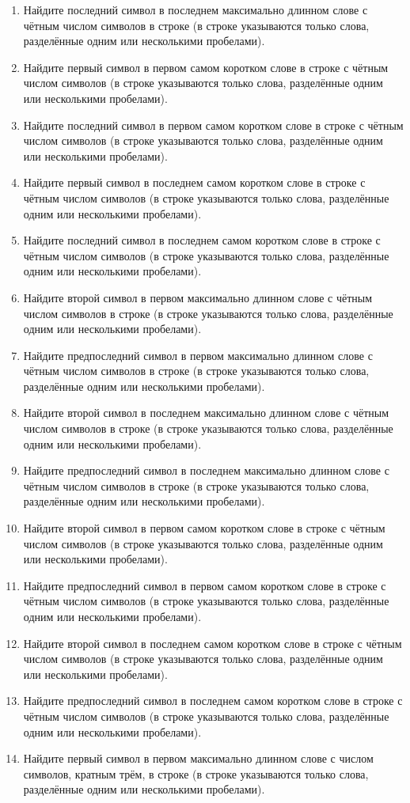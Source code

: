 \begin{enumerate}
\item Найдите последний символ в последнем максимально длинном слове с чётным числом символов в строке (в строке указываются только слова, разделённые одним или несколькими пробелами). 
\item Найдите первый символ в первом самом коротком слове в строке с чётным числом символов (в строке указываются только слова, разделённые одним или несколькими пробелами). 
\item Найдите последний символ в первом самом коротком слове в строке с чётным числом символов (в строке указываются только слова, разделённые одним или несколькими пробелами). 
\item Найдите первый символ в последнем самом коротком слове в строке с чётным числом символов (в строке указываются только слова, разделённые одним или несколькими пробелами). 
\item Найдите последний символ в последнем самом коротком слове в строке с чётным числом символов (в строке указываются только слова, разделённые одним или несколькими пробелами). 
\item Найдите второй символ в первом максимально длинном слове с чётным числом символов в строке (в строке указываются только слова, разделённые одним или несколькими пробелами). 
\item Найдите предпоследний символ в первом максимально длинном слове с чётным числом символов в строке (в строке указываются только слова, разделённые одним или несколькими пробелами). 
\item Найдите второй символ в последнем максимально длинном слове с чётным числом символов в строке (в строке указываются только слова, разделённые одним или несколькими пробелами). 
\item Найдите предпоследний символ в последнем максимально длинном слове с чётным числом символов в строке (в строке указываются только слова, разделённые одним или несколькими пробелами). 
\item Найдите второй символ в первом самом коротком слове в строке с чётным числом символов (в строке указываются только слова, разделённые одним или несколькими пробелами). 
\item Найдите предпоследний символ в первом самом коротком слове в строке с чётным числом символов (в строке указываются только слова, разделённые одним или несколькими пробелами). 
\item Найдите второй символ в последнем самом коротком слове в строке с чётным числом символов (в строке указываются только слова, разделённые одним или несколькими пробелами). 
\item Найдите предпоследний символ в последнем самом коротком слове в строке с чётным числом символов (в строке указываются только слова, разделённые одним или несколькими пробелами). 
\item Найдите первый символ в первом максимально длинном слове с числом символов, кратным трём, в строке (в строке указываются только слова, разделённые одним или несколькими пробелами). 
\end{enumerate}

